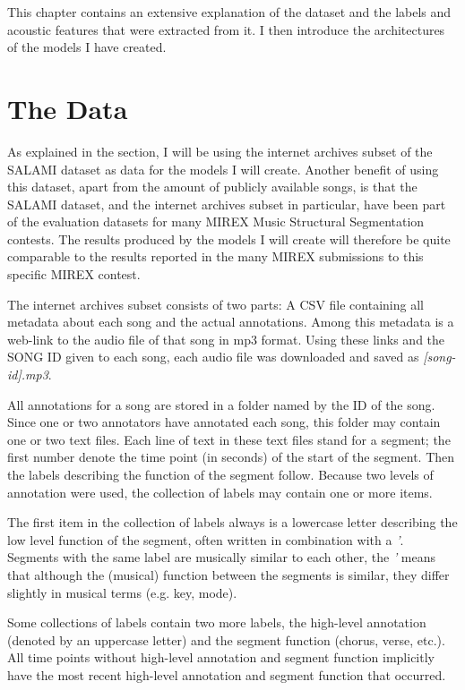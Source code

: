 This chapter contains an extensive explanation of the dataset and the labels and acoustic features that were extracted from it. I then introduce the architectures of the models I have created.


\section{The Data}
\label{sec:3.the_data}
As explained in the  section, I will be using the internet archives subset of the SALAMI dataset as data for the models I will create. Another benefit of using this dataset, apart from the amount of publicly available songs, is that the SALAMI dataset, and the internet archives subset in particular, have been part of the evaluation datasets for many MIREX Music Structural Segmentation contests. The results produced by the models I will create will therefore be quite comparable to the results reported in the many MIREX submissions to this specific MIREX contest.

The internet archives subset consists of two parts: A CSV file containing all metadata about each song and the actual annotations. Among this metadata is a web-link to the audio file of that song in mp3 format. Using these links and the SONG ID given to each song, each audio file was downloaded and saved as \textit{[song-id].mp3}.

All annotations for a song are stored in a folder named by the ID of the song. Since one or two annotators have annotated each song, this folder may contain one or two text files. Each line of text in these text files stand for a segment; the first number denote the time point (in seconds) of the start of the segment. Then the labels describing the function of the segment follow. Because two levels of annotation were used, the collection of labels may contain one or more items.

The first item in the collection of labels always is a lowercase letter describing the low level function of the segment, often written in combination with a \textit{'}. Segments with the same label are musically similar to each other, the \textit{'} means that although the (musical) function between the segments is similar, they differ slightly in musical terms (e.g. key, mode).

Some collections of labels contain two more labels, the high-level annotation (denoted by an uppercase letter) and the segment function (chorus, verse, etc.). All time points without high-level annotation and segment function implicitly have the most recent high-level annotation and segment function that occurred. 

